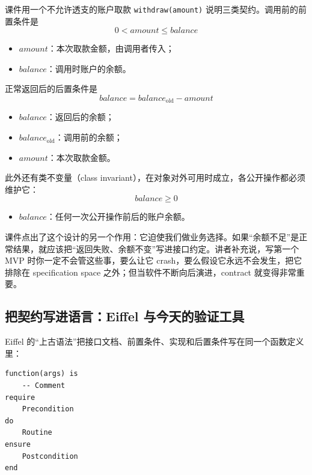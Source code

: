 \documentclass[a4paper]{article}
\begin{document}
课件用一个不允许透支的账户取款 \texttt{withdraw(amount)} 说明三类契约。调用前的前置条件是
\begin{equation}
0 < \mathit{amount} \le \mathit{balance}
\end{equation}
\begin{itemize}
  \item $\mathit{amount}$：本次取款金额，由调用者传入；
  \item $\mathit{balance}$：调用时账户的余额。
\end{itemize}
正常返回后的后置条件是
\begin{equation}
\mathit{balance} = \mathit{balance}_{\mathrm{old}} - \mathit{amount}
\end{equation}
\begin{itemize}
  \item $\mathit{balance}$：返回后的余额；
  \item $\mathit{balance}_{\mathrm{old}}$：调用前的余额；
  \item $\mathit{amount}$：本次取款金额。
\end{itemize}
此外还有类不变量（class invariant），在对象对外可用时成立，各公开操作都必须维护它：
\begin{equation}
\mathit{balance} \ge 0
\end{equation}
\begin{itemize}
  \item $\mathit{balance}$：任何一次公开操作前后的账户余额。
\end{itemize}

课件点出了这个设计的另一个作用：它迫使我们做业务选择。如果“余额不足”是正常结果，就应该把“返回失败、余额不变”写进接口约定。讲者补充说，写第一个 MVP 时你一定不会管这些事，要么让它 crash，要么假设它永远不会发生，把它排除在 specification space 之外；但当软件不断向后演进，contract 就变得非常重要。

\subsection{把契约写进语言：Eiffel 与今天的验证工具}

Eiffel 的“上古语法”把接口文档、前置条件、实现和后置条件写在同一个函数定义里：

\begin{lstlisting}[caption={Eiffel 的契约语法骨架（摘自下图课件）}]
function(args) is
    -- Comment
require
    Precondition
do
    Routine
ensure
    Postcondition
end
\end{lstlisting}
\end{document}
